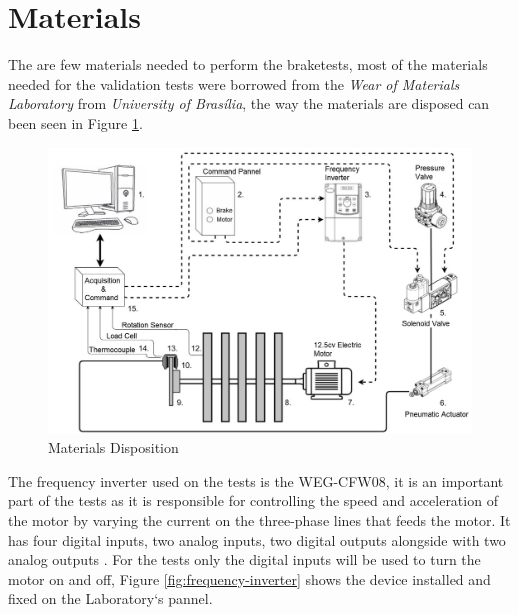 \section{Materials}\label{sec:materials}
		The are few materials needed to perform the braketests, most of the materials needed for the validation tests were borrowed from the \textit{Wear of Materials Laboratory} from \textit{University of Brasília}, the way the materials are disposed can been seen in Figure \ref{fig:materials-scheme}.

		\begin{figure}[htbp]
			\centering
			\includegraphics[width=1\textwidth]{figuras/fig-materials-scheme}
			\caption{Materials Disposition}
			\label{fig:materials-scheme}
		\end{figure}

		\par
		The frequency inverter used on the tests is the WEG-CFW08, it is an important part of the tests as it is responsible for controlling the speed and acceleration of the motor by varying the current on the three-phase lines that feeds the motor. It has four digital inputs, two analog inputs, two digital outputs alongside with two analog outputs \cite{wegCFW08Manual}. For the tests only the digital inputs will be used to turn the motor on and off, Figure \ref{fig:frequency-inverter} shows the device installed and fixed on the Laboratory`s pannel.

